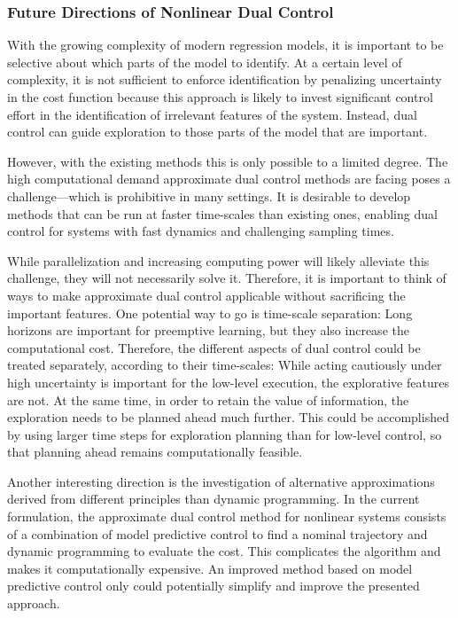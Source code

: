 \subsubsection{Future Directions of Nonlinear Dual Control}

With the growing complexity of modern regression models, it is important to be
selective about which parts of the model to identify. At a certain level of
complexity, it is not sufficient to enforce identification by penalizing
uncertainty in the cost function because this approach is likely to invest
significant control effort in the identification of irrelevant features of the
system. Instead, dual control can guide exploration to those parts of the model
that are important.

However, with the existing methods this is only possible to a limited degree.
The high computational demand approximate dual control methods are facing
poses a challenge---which is prohibitive in many settings. It is desirable to
develop methods that can be run at faster time-scales than existing ones,
enabling dual control for systems with fast dynamics and challenging sampling
times.

While parallelization and increasing computing power will likely alleviate this
challenge, they will not necessarily solve it. Therefore, it is important to
think of ways to make approximate dual control applicable without sacrificing
the important features. One potential way to go is time-scale separation: Long
horizons are important for preemptive learning, but they also increase the
computational cost. Therefore, the different aspects of dual control could be
treated separately, according to their time-scales: While acting cautiously
under high uncertainty is important for the low-level execution, the
explorative features are not. At the same time, in order to retain the value of
information, the exploration needs to be planned ahead much further.
This could be accomplished by using larger time steps for exploration planning
than for low-level control, so that planning ahead remains computationally
feasible.

Another interesting direction is the investigation of alternative
approximations derived from different principles than dynamic programming. In
the current formulation, the approximate dual control method for nonlinear
systems consists of a combination of model predictive control to find a nominal
trajectory and dynamic programming to evaluate the cost. This complicates the
algorithm and makes it computationally expensive. An improved method based on
model predictive control only could potentially simplify and improve the
presented approach.
